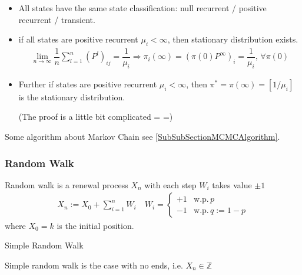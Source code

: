 \begin{itemize}[topsep=2pt,itemsep=0pt]
    \item All states have the same state classification: null recurrent / positive recurrent / transient.
    \item if all states are positive recurrent $ \mu _i<\infty $, then stationary distribution exists.
    \begin{align*}
        \lim_{n\to \infty}\dfrac{1}{n}\sum_{l=1}^n(P^l)_{ij}=\dfrac{1}{\mu _i}\Rightarrow \pi_i(\infty)=(\pi(0)P^\infty)_i= \dfrac{1}{\mu _i},\, \forall \pi(0)
    \end{align*}
    \item Further if states are positive recurrent $ \mu _i<\infty $, then $ \pi^*=\pi(\infty)=[1/\mu _i] $ is the stationary distribution.

    (The proof is a little bit complicated = =)
    
\end{itemize}

Some algorithm about Markov Chain see \autoref{SubSubSectionMCMCAlgorithm}.




\subsubsection{Random Walk}

Random walk is a renewal process $ X_n $ with each step $ W_i $ takes value $ \pm 1 $
\begin{align*}
    X_n := X_0 +\sum_{i=1}^nW_i\quad W_i=\begin{cases}
        +1&\mathrm{w.p.}\, p\\
        -1&\mathrm{w.p.}\, q:=1-p  
    \end{cases}
\end{align*}
where $ X_0=k $ is the initial position.

\begin{point}
    Simple Random Walk
\end{point}

Simple random walk is the case with no ends, i.e. $ X_n\in \mathbb{Z} $


